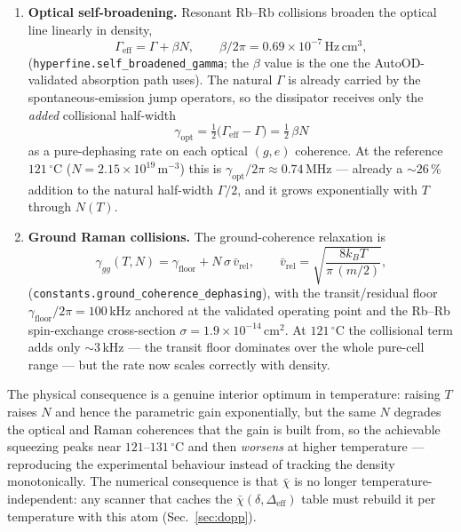 \documentclass[11pt]{article}
\newcommand{\eff}{\mathrm{eff}}
\newcommand{\code}[1]{\texttt{#1}}
\newcommand{\rhobar}{\bar{\chi}}
\begin{document}
\begin{enumerate}[leftmargin=2.2em]
  \item \textbf{Optical self-broadening.} Resonant Rb--Rb collisions broaden the
  optical line linearly in density,
  \begin{equation}
  \Gamma_\eff=\Gamma+\beta N,
  \qquad
  \beta/2\pi=0.69\times10^{-7}\,\mathrm{Hz\,cm^{3}},
  \label{eq:selfbroad}
  \end{equation}
  (\code{hyperfine.self\_broadened\_gamma}; the $\beta$ value is the one the
  AutoOD-validated absorption path uses). The natural $\Gamma$ is already carried
  by the spontaneous-emission jump operators, so the dissipator receives only the
  \emph{added} collisional half-width
  \begin{equation}
  \gamma_{\text{opt}}=\tfrac12\big(\Gamma_\eff-\Gamma\big)=\tfrac12\,\beta N
  \label{eq:gammaopt}
  \end{equation}
  as a pure-dephasing rate on each optical $(g,e)$ coherence. At the reference
  $121\,^\circ$C ($N=2.15\times10^{19}\,\mathrm{m^{-3}}$) this is
  $\gamma_{\text{opt}}/2\pi\approx0.74\,$MHz --- already a $\sim\!26\,\%$
  addition to the natural half-width $\Gamma/2$, and it grows exponentially with
  $T$ through $N(T)$.
  \item \textbf{Ground Raman collisions.} The ground-coherence relaxation is
  \begin{equation}
  \gamma_{gg}(T,N)=\gamma_{\text{floor}}+N\,\sigma\,\bar v_{\text{rel}},
  \qquad
  \bar v_{\text{rel}}=\sqrt{\frac{8k_BT}{\pi\,(m/2)}},
  \label{eq:gammagg}
  \end{equation}
  (\code{constants.ground\_coherence\_dephasing}), with the transit/residual
  floor $\gamma_{\text{floor}}/2\pi=100\,$kHz anchored at the validated operating
  point and the Rb--Rb spin-exchange cross-section
  $\sigma=1.9\times10^{-14}\,\mathrm{cm^{2}}$. At $121\,^\circ$C the collisional
  term adds only $\sim\!3\,$kHz --- the transit floor dominates over the whole
  pure-cell range --- but the rate now scales correctly with density.
\end{enumerate}

The physical consequence is a genuine interior optimum in temperature: raising
$T$ raises $N$ and hence the parametric gain exponentially, but the same $N$
degrades the optical and Raman coherences that the gain is built from, so the
achievable squeezing peaks near $121$--$131\,^\circ$C and then \emph{worsens} at
higher temperature --- reproducing the experimental behaviour instead of tracking
the density monotonically. The numerical consequence is that $\rhobar$ is no
longer temperature-independent: any scanner that caches the
$\rhobar(\delta,\Delta_\eff)$ table must rebuild it per temperature with this
atom (Sec.~\ref{sec:dopp}).
\end{document}
